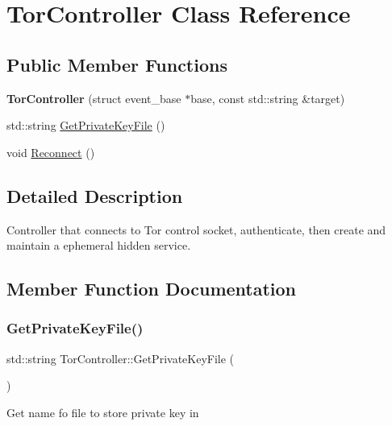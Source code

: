 \hypertarget{class_tor_controller}{}\section{Tor\+Controller Class Reference}
\label{class_tor_controller}
\subsection*{Public Member Functions}
\begin{DoxyCompactItemize}
\item 
\mbox{\label{class_tor_controller_ab38d90df15a9e3f2c6e1f4f24073a64e}} 
{\bfseries Tor\+Controller} (struct event\+\_\+base $\ast$base, const std\+::string \&target)
\item 
std\+::string \mbox{\hyperlink{class_tor_controller_a524481ece961670f745dbbfb4d9d5a33}{Get\+Private\+Key\+File}} ()
\item 
void \mbox{\hyperlink{class_tor_controller_ae5d4304836fce79574ec540c5ada8269}{Reconnect}} ()
\end{DoxyCompactItemize}


\subsection{Detailed Description}
Controller that connects to Tor control socket, authenticate, then create and maintain a ephemeral hidden service. 

\subsection{Member Function Documentation}
\mbox{\label{class_tor_controller_a524481ece961670f745dbbfb4d9d5a33}} 
\subsubsection{\texorpdfstring{GetPrivateKeyFile()}{GetPrivateKeyFile()}}
{\footnotesize\ttfamily std\+::string Tor\+Controller\+::\+Get\+Private\+Key\+File (\begin{DoxyParamCaption}{ }\end{DoxyParamCaption})}

Get name fo file to store private key in \mbox{\label{class_tor_controller_ae5d4304836fce79574ec540c5ada8269}} 
